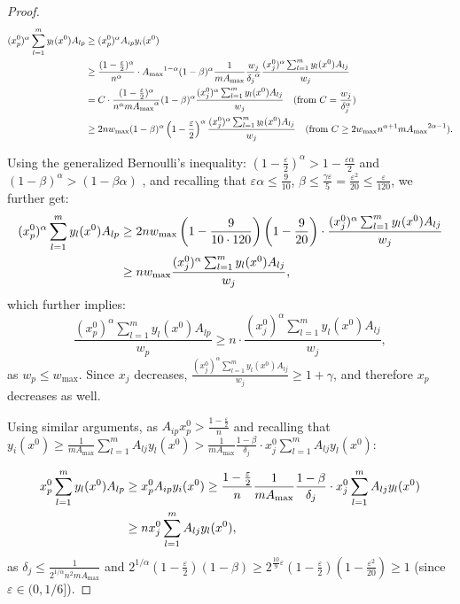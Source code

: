 \documentclass[11pt]{article}
\begin{document}
\begin{proof}
\begin{align}
(x_p^0)^{\alpha}\sum_{l=1}^m y_l(x^0)A_{lp} &\geq (x_p^0)^{\alpha}A_{ip}y_i(x^0)\notag\\
&\geq \frac{(1-\frac{\varepsilon}{2})^{\alpha}}{n^\alpha}\cdot {A_{\max}}^{1-\alpha} (1-\beta)^\alpha\frac{1}{mA_{\max}}\frac{w_j}{{\delta_j}^{\alpha}}\frac{(x_j^0)^{\alpha}\sum_{l=1}^m y_l(x^0)A_{lj}}{w_j}\notag\\
&= C\cdot \frac{(1-\frac{\varepsilon}{2})^{\alpha}}{n^\alpha m {A_{\max}}^{\alpha}}(1-\beta)^\alpha\frac{(x_j^0)^{\alpha}\sum_{l=1}^m y_l(x^0)A_{lj}}{w_j}\quad (\text{from } C= \frac{w_j}{\delta_j^{\alpha}})\notag\\
&\geq 2n w_{\max} (1-\beta)^\alpha\left(1-\frac{\varepsilon}{2}\right)^{\alpha}\frac{(x_j^0)^{\alpha}\sum_{l=1}^m y_l(x^0)A_{lj}}{w_j}\quad (\text{from } C\geq 2w_{\max} n^{\alpha+1}m {A_{\max}}^{2\alpha-1})\notag.
\end{align}

Using the generalized Bernoulli's inequality: $\left(1-\frac{\varepsilon}{2}\right)^{\alpha}>1-\frac{\varepsilon\alpha}{2}$ and $(1-\beta)^\alpha>(1-\beta\alpha)$ \cite{mitrinovic1970analytic}, and recalling that $\varepsilon\alpha\leq \frac{9}{10}$, $\beta \leq \frac{\gamma\varepsilon}{5} = \frac{\varepsilon^2}{20}\leq \frac{\varepsilon}{120}$, we further get:
\begin{align}
(x_p^0)^{\alpha}\sum_{l=1}^m y_l(x^0)A_{lp} &\geq 2nw_{\max}\left(1 - \frac{9}{10\cdot120}\right)\left(1 - \frac{9}{20}\right)\cdot \frac{(x_j^0)^{\alpha}\sum_{l=1}^m y_l(x^0)A_{lj}}{w_j}\notag\\
&\geq n w_{\max}\frac{(x_j^0)^{\alpha}\sum_{l=1}^m y_l(x^0)A_{lj}}{w_j}\notag, 
\end{align}
which further implies:
\begin{equation}
\frac{(x_p^0)^{\alpha}\sum_{l=1}^m y_l(x^0)A_{lp}}{w_p} \geq n\cdot \frac{(x_j^0)^{\alpha}\sum_{l=1}^m y_l(x^0)A_{lj}}{w_j},\label{eq:condition-n-dominance}
\end{equation}
as $w_p\leq w_{\max}$. Since $x_j$ decreases, $\frac{(x_j^0)^{\alpha}\sum_{l=1}^m y_l(x^0)A_{lj}}{w_j}\geq 1 + \gamma$, and therefore $x_p$ decreases as well.

Using similar arguments, as $A_{ip}x_p^0>\frac{1-\frac{\varepsilon}{2}}{n}$ and recalling that $y_i(x^0)\geq \frac{1}{m A_{\max}}\sum_{l=1}^mA_{lj}y_l(x^0) >\frac{1}{m A_{\max}}\frac{1-\beta}{\delta_j}\cdot x_j^0\sum_{l=1}^mA_{lj}y_l(x^0)$:

\begin{align}
x_p^0\sum_{l=1}^m y_l(x^0)A_{lp} &\geq x_p^0 A_{ip}y_i(x^0)\geq \frac{1-\frac{\varepsilon}{2}}{n}\frac{1}{m A_{\max}}\frac{1-\beta}{\delta_j}\cdot x_j^0\sum_{l=1}^mA_{lj}y_l(x^0)\notag\\
&\geq n x_j^0\sum_{l=1}^mA_{lj}y_l(x^0), \label{eq:slackness-n-dominance}
\end{align}
as $\delta_j \leq \frac{1}{2^{1/\alpha}n^2mA_{\max}}$ and $2^{1/\alpha}(1-\frac{\varepsilon}{2})(1-\beta)\geq 2^{\frac{10}{9}\varepsilon}(1-\frac{\varepsilon}{2})(1-\frac{\varepsilon^2}{20})\geq 1$ (since $\varepsilon \in (0, 1/6]$).


\end{proof}
\end{document}
